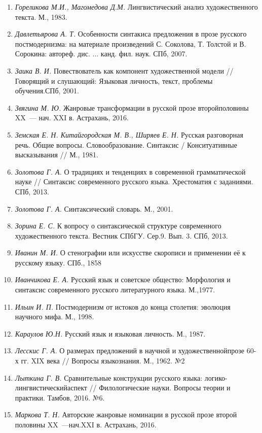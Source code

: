 \begin{enumerate}
        \item \textit{Гореликова М.И., Магомедова Д.М.} Лингвистический анализ художественного текста. М., 1983.
        \item \textit{Давлетьярова А. Т.} Особенности синтакиса предложения в прозе русского постмодернизма: на материале произведений С. Соколова, Т. Толстой и В. Сорокина: автореф. дис. ... канд. фил. наук. СПб, 2007.
        \item \textit{Заика В. И.} Повествователь как компонент художественной модели // Говорящий и слушающий: Языковая личность, текст, проблемы обучения.СПб, 2001.
        \item \textit{Звягина М. Ю.} Жанровые трансформации в русской прозе второйполовины XX~--- нач. XXI в. Астрахань, 2016.
        \item \textit{Земская Е. Н. Китайгородская М. В., Ширяев Е. Н.} Русская разговорная речь. Общие вопросы. Словообразование. Синтаксис / Конситуативные высказывания // М., 1981.
        \item \textit{Золотова Г. А.} О традициях и тенденциях в современной грамматической науке // Синтаксис современного русского языка. Хрестоматия с заданиями. СПб, 2013. 
        \item \textit{Золотова Г. А.} Синтаксический словарь. М., 2001.
        \item \textit{Зорина Е. С.} К вопросу о синтаксической структуре современного художественного текста. Вестник СПбГУ. Сер.9. Вып. 3. СПб, 2013.
        \item \textit{Иванин М. И. } О стенографии или искусстве скорописи и применении её к русскому языку. СПб., 1858
        \item \textit{Иванчикова Е. А.} {Русский язык и советское общество: Морфология и синтаксис современного русского литературного языка. М.,1977.}
        \item \textit{Ильин И. П.} Постмодернизм от истоков до конца столетия: эволюция научного мифа. М., 1998. 
        \item \textit{Караулов  Ю.Н.} {Русский язык и языковая личность. М., 1987. }
        \item \textit{Лесскис Г. А.} О размерах предложений в научной и художественнойпрозе 60-х гг. XIX века // Вопросы языкознания. М., 1962. №2
        \item \textit{Лыткина Г. В.} Сравнительные конструкции русского языка: логико-лингвистическийаспект // Филологические науки. Вопросы теории и практики. Тамбов, 2016. №6.
        \item \textit{Маркова Т. Н.} Авторские жанровые номинации в русской прозе второй половины XX~---нач.XXI в. Астрахань, 2016.

\end{enumerate}
